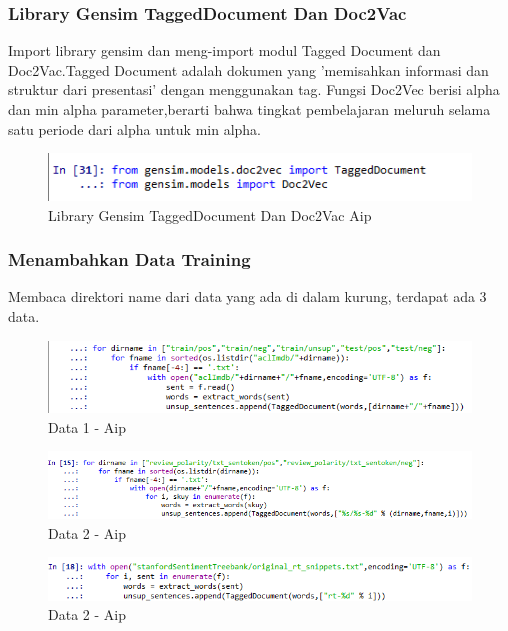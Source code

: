 \subsubsection{Library Gensim TaggedDocument Dan Doc2Vac}
Import library gensim dan meng-import modul Tagged Document dan Doc2Vac.Tagged Document adalah dokumen yang 'memisahkan informasi dan struktur dari presentasi' dengan menggunakan tag. Fungsi Doc2Vec berisi alpha dan min alpha parameter,berarti bahwa tingkat pembelajaran meluruh selama satu periode dari alpha untuk min alpha.
\begin{figure}[!hbtp]
\centering
\includegraphics[scale=0.3]{figures/AIP/e18.PNG}
\caption{Library Gensim TaggedDocument Dan Doc2Vac Aip}
\label{Tagged Document dan Doc2Vec - Aip}
\end{figure}

\subsubsection{Menambahkan Data Training}
Membaca direktori name dari data yang ada di dalam kurung, terdapat ada 3 data.
\begin{figure}[!hbtp]
\centering
\includegraphics[scale=0.3]{figures/AIP/e19.PNG}
\caption{Data 1 - Aip}
\label{Data 1 - Aip}
\end{figure}

\begin{figure}[!hbtp]
\centering
\includegraphics[scale=0.3]{figures/AIP/e20.PNG}
\caption{Data 2 - Aip}
\label{Data 2 - Aip}
\end{figure}

\begin{figure}[!hbtp]
\centering
\includegraphics[scale=0.3]{figures/AIP/e21.PNG}
\caption{Data 2 - Aip}
\label{Data 2 - Aip}
\end{figure}

